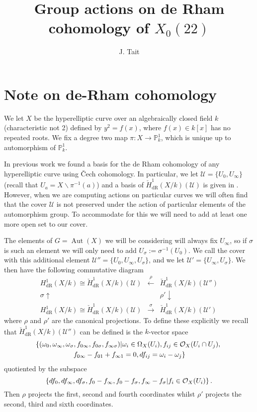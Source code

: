 \documentclass[draft, 11pt]{article} %
\title{Group actions on de Rham cohomology of $X_0(22)$}
\author{J. Tait}
\theoremstyle{plain}
\theoremstyle{remark}
\newcommand{\cO}{{\cal O}}
\newcommand{\ra}{\rightarrow}
\newcommand{\cU}{{\mathcal U}}
\newcommand{\cech}{\v{C}ech }
\newcommand{\derhamhone}{H_{\text {dR}}^1(X/k)}
\newcommand{\cechderhamhone}{\check{H}_{\text {dR}}^1(X/k)}
\DeclareMathOperator{\aut}{Aut}
\begin{document}
\maketitle
\listoftodos
\bigskip

\section{Note on de-Rham cohomology}
We let $X$ be the hyperelliptic curve over an algebraically closed field $k$ (characteristic not 2) defined by $y^2 = f(x)$, where $f(x) \in k[x]$ has no repeated roots.
We fix a degree two map $\pi \colon X \ra \mathbb P^1_k$, which is unique up to automorphism of $\mathbb P_k^1$.



In previous work we found a basis for the de Rham cohomology of any hyperelliptic curve using \cech cohomology.
In particular, we let $\cU = \{ U_0 , U_\infty\}$ (recall that $U_a = X\backslash \pi^{-1}(a)$) and a basis of $\cechderhamhone(\cU)$ is given in \cite{derhamactions}.
However, when we are computing actions on particular curves we will often find that the cover $\cU$ is not preserved under the action of particular elements of the automorphism group.
To accommodate for this we will need to add at least one more open set to our cover.


The elements of $G= \aut(X)$ we will be considering will always fix $U_\infty$, so if $\sigma$ is such an element we will only need to add $U_\sigma := \sigma^{-1}(U_0)$.
We call the cover with this additional element $\cU'' = \{U_0, U_\infty, U_\sigma\}$, and we let $\cU' = \{U_\infty, U_\sigma\}$.
We then have the following commutative diagram
\[
\begin{array}{ccc}
\derhamhone \cong \cechderhamhone(\cU)  & \xleftarrow{\rho} & \cechderhamhone(\cU'')  \\
\sigma\uparrow & ~ & \rho'\downarrow  \\
\derhamhone \cong \cechderhamhone(\cU)  & \xrightarrow{\sigma} & \cechderhamhone(\cU')
\end{array}
\]
where $\rho$ and $\rho'$ are the canonical projections.
To define these explicitly we recall that $\cechderhamhone(\cU'')$ can be defined is the $k$-vector space 
\begin{multline}\label{sixtupleconditions}
\left\{ (\omega_0, \omega_\infty , \omega_\sigma, f_{0\infty}, f_{0 \sigma},f_{\infty \sigma}) | \omega_i \in \Omega_X(U_i), f_{ij} \in \cO_X(U_i \cap U_j), \right. \\ \left. f_{0\infty} - f_{01} + f_{\infty1} = 0, df_{ij} = \omega_i - \omega_j \right\}
\end{multline}
quotiented by the subspace 
\[
\left\{ df_0, df_\infty, df_\sigma, f_0- f_\infty, f_0 - f_\sigma, f_\infty - f_\sigma | f_i \in \cO_X(U_i)\right\}.
\]
Then $\rho$ projects the first, second and fourth coordinates whilst $\rho'$ projects the second, third and sixth coordinates.
\end{document}
